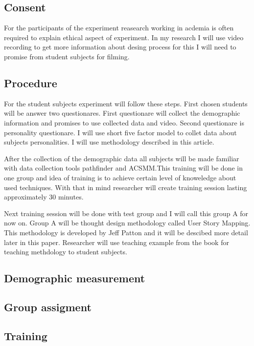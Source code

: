 \documentclass[english]{tktltiki2}
\theoremstyle{definition}
\theoremstyle{remark}
\begin{document}
\subsection{Consent}

For the participants of the experiment reasearch working in acdemia is often required to explain ethical aspect of experiment\cite{experiment}. In my research I will use video recording to get more information about desing process for this I will need to promise from student subjects for filming.

\subsection{Procedure}

For the student subjects experiment will follow these steps. First chosen students will be answer two questionares. First questionare will collect the demographic information and promises to use collected data and video. Second questionare is personality questionare. I will use short five factor model to collet data about subjects personalities. I will use methodology described in this article\cite{fiveFactor}.

After the collection of the demographic data all subjects will be made familiar with data collection tools pathfinder\cite{pathfinder} and ACSMM\cite{acsmm}.This training will be done in one group and idea of training is to achieve certain level of knoweledge about used techniques. With that in mind researcher will create training session lasting approximately 30 minutes.

Next training session will be done with test group and I will call this group A for now on. Group A will be thought design methodology called User Story Mapping\cite{userStoryMapping}. This methodology is developed by Jeff Patton and it will be descibed more detail later in this paper. Researcher will use teaching example from the book for teaching methdology to student subjects.  

\subsection{Demographic measurement}

\subsection{Group assigment}

\subsection{Training}
\end{document}
